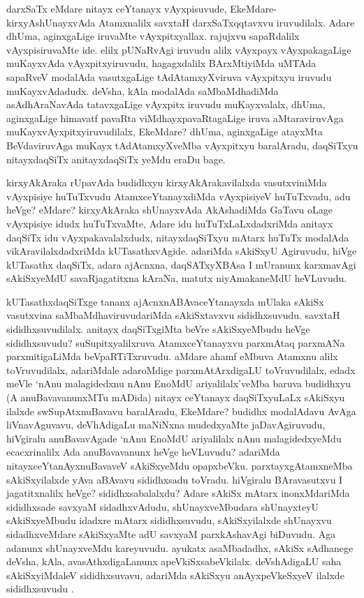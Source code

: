 \begin{artha}
darxSaTx eMdare nitayx ceYtanayx vAyxpisuvude, EkeMdare-kirxyAshUnayxvAda Atamxnalilx savxtaH darxSaTxqqtavxvu iruvudilalx. Adare dhUma, aginxgaLige iruvaMte vAyxpitxyallax. rajujxvu sapaRdalilx vAyxpisiruvaMte ide. elilx pUNaRvAgi iruvudu alilx vAyxpayx vAyxpakagaLige muKayxvAda vAyxpitxyiruvudu, hagagxdalilx BArxMtiyiMda uMTAda sapaRveV modalAda vasutxgaLige tAdAtamxyXviruva vAyxpitxyu iruvudu muKayxvAdadudx. deVsha, kAla modalAda saMbaMdhadiMda asAdhAraNavAda tatavxgaLige vAyxpitx iruvudu muKayxvalalx, dhUma, aginxgaLige himavatf pavaRta viMdhayxpavaRtagaLige iruva aMtaraviruvAga muKayxvAyxpitxyiruvudilalx, EkeMdare? dhUma, aginxgaLige atayxMta BeVdaviruvAga muKayx tAdAtamxyXveMba vAyxpitxyu baralAradu, daqSiTxyu nitayxdaqSiTx anitayxdaqSiTx yeMdu eraDu bage.
\end{artha}

\begin{artha}
kirxyAkAraka rUpavAda budidhxyu kirxyAkArakavilalxda vasutxviniMda vAyxpisiye huTuTxvudu AtamxceYtanayxdiMda vAyxpisiyeV huTuTxvadu, adu heVge? eMdare? kirxyAkAraka shUnayxvAda AkAshadiMda GaTavu oLage vAyxpisiye idudx huTuTxvaMte, Adare idu huTuTxLaLxdadxriMda anitayx daqSiTx idu vAyxpakavalalxdudx, nitayxdaqSiTxyu mAtarx huTuTx modalAda vikAravilalxdadxriMda kUTasathxvAgide. adariMda sAkiSxyU Agiruvudu, hiVge kUTasathx daqSiTx, adara ajAcnxna, daqSATxyXBAsa I mUranunx karxmavAgi sAkiSxyeMdU savaRjagatitxna kAraNa, matutx niyAmakaneMdU heVLuvudu.
\end{artha}

\begin{artha}
kUTasathxdaqSiTxge tananx ajAcnxnABAvaceYtanayxda mUlaka sAkiSx vasutxvina saMbaMdhaviruvudariMda sAkiSxtavxvu sididhxsuvudu. savxtaH sididhxsuvudilalx. anitayx daqSiTxgiMta beVre sAkiSxyeMbudu heVge sididhxsuvudu? suSupitxyalilxruva AtamxceYtanayxvu parxmAtaq parxmANa parxmitigaLiMda beVpaRTiTxruvudu. aMdare ahamf eMbuva Atamxnu alilx toVruvudilalx, adariMdale adaroMdige parxmAtArxdigaLU toVruvudilalx, edadx meVle `nAnu malagidedxnu nAnu EnoMdU ariyalilalx'veMba baruva budidhxyu (A anuBavavanunxMTu mADida) nitayx ceYtanayx daqSiTxyuLaLx sAkiSxyu ilalxde swSupAtxnuBavavu baralAradu, EkeMdare? budidhx modalAdavu AvAga liVnavAguvavu, deVhAdigaLu maNiNxna mudedxyaMte jaDavAgiruvudu, hiVgiralu anuBavavAgade `nAnu EnoMdU ariyalilalx nAnu malagidedxyeMdu ecacxrinalilx Ada anuBavavanunx heVge heVLuvudu? adariMda nitayxceYtanAyxnuBavaveV sAkiSxyeMdu opapxbeVku. parxtayxgAtamxneMba sAkiSxyilalxde yAva aBAvavu sididhxsadu toVradu. hiVgiralu BAravasutxvu I jagatitxnalilx heVge? sididhxsabalalxdu? Adare sAkiSx mAtarx inonxMdariMda sididhxsade savxyaM sidadhxvAdudu, shUnayxveMbudara shUnayxteyU sAkiSxyeMbudu idadxre mAtarx sididhxsuvudu, sAkiSxyilalxde shUnayxvu sidadhxveMdare sAkiSxyaMte adU savxyaM parxkAshavAgi biDuvudu. Aga adanunx shUnayxveMdu kareyuvudu. ayukatx asaMbadadhx, sAkiSx sAdhanege deVsha, kAla, avasAthxdigaLanunx apeVkiSxsabeVkilalx. deVshAdigaLU saha sAkiSxyiMdaleV sididhxsuvavu, adariMda sAkiSxyu anAyxpeVkeSxyeV ilalxde sididhxsuvudu .
\end{artha}

